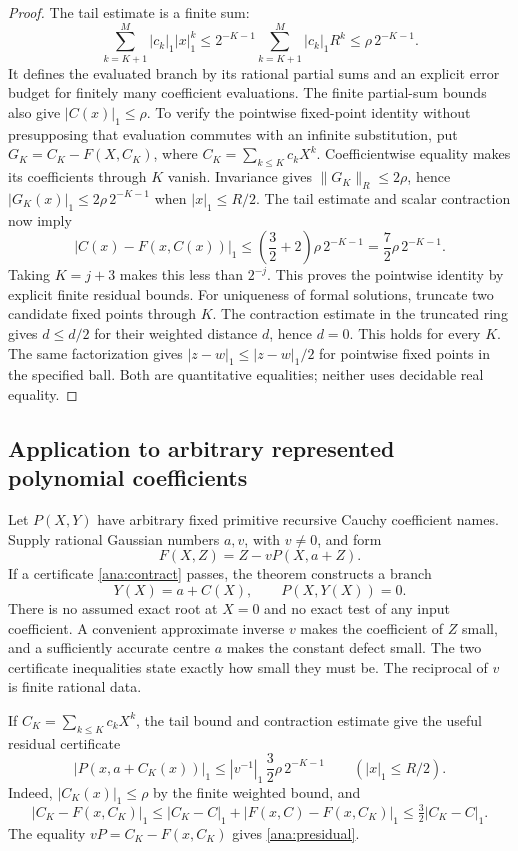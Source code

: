\begin{proof}
The tail estimate is a finite sum:
\[
 \sum_{k=K+1}^M|c_k|_1|x|_1^k
 \le 2^{-K-1}\sum_{k=K+1}^M|c_k|_1R^k
 \le\rho\,2^{-K-1}.
\]
It defines the evaluated branch by its rational partial sums and an
explicit error budget for finitely many coefficient evaluations.
The finite partial-sum bounds also give $|C(x)|_1\le\rho$.
To verify the pointwise fixed-point identity without presupposing that
evaluation commutes with an infinite substitution, put
$G_K=C_K-F(X,C_K)$, where $C_K=\sum_{k\le K}c_kX^k$.
Coefficientwise equality makes its coefficients through $K$ vanish.
Invariance gives $\lVert G_K\rVert_R\le2\rho$, hence
$|G_K(x)|_1\le2\rho\,2^{-K-1}$ when $|x|_1\le R/2$.
The tail estimate and scalar contraction now imply
\[
 |C(x)-F(x,C(x))|_1
 \le\left(\frac32+2\right)\rho\,2^{-K-1}
 =\frac72\rho\,2^{-K-1}.
\]
Taking $K=j+3$ makes this less than $2^{-j}$.
This proves the pointwise identity by explicit finite residual bounds.
For uniqueness of formal solutions, truncate two candidate fixed points
through $K$.  The contraction estimate in the truncated ring gives
$d\le d/2$ for their weighted distance $d$, hence $d=0$.
This holds for every $K$.  The same factorization gives
$|z-w|_1\le|z-w|_1/2$ for pointwise fixed points in the specified ball.
Both are quantitative equalities; neither uses decidable real equality.
\end{proof}

\subsection{Application to arbitrary represented polynomial coefficients}

Let $P(X,Y)$ have arbitrary fixed primitive recursive Cauchy coefficient
names.  Supply rational Gaussian numbers $a,v$, with $v\ne0$, and form
\[
 F(X,Z)=Z-vP(X,a+Z).
\]
If a certificate \eqref{ana:contract} passes, the theorem constructs a
branch
\[
 Y(X)=a+C(X),\qquad P(X,Y(X))=0.
\]
There is no assumed exact root at $X=0$ and no exact test of any input
coefficient.  A convenient approximate inverse $v$ makes the coefficient
of $Z$ small, and a sufficiently accurate centre $a$ makes the constant
defect small.  The two certificate inequalities state exactly how small
they must be.  The reciprocal of $v$ is finite rational data.

If $C_K=\sum_{k\le K}c_kX^k$, the tail bound and contraction estimate give
the useful residual certificate
\begin{equation}
 |P(x,a+C_K(x))|_1
 \le |v^{-1}|_1\,\frac32\rho\,2^{-K-1}
 \qquad(|x|_1\le R/2).
 \label{ana:presidual}
\end{equation}
Indeed, $|C_K(x)|_1\le\rho$ by the finite weighted bound, and
\[
 |C_K-F(x,C_K)|_1
 \le |C_K-C|_1+|F(x,C)-F(x,C_K)|_1
 \le\tfrac32|C_K-C|_1.
\]
The equality $vP=C_K-F(x,C_K)$ gives \eqref{ana:presidual}.

